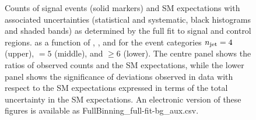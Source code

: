 \begin{figure}
\begin{center}
  \caption{Counts of signal events (solid markers) and SM expectations
    with associated uncertainties (statistical and systematic, black
    histograms and shaded bands) 
    as determined by the full fit to signal and control regions.
    as a function of \nb, \scalht, and \mht for the event categories
    $n_{\text{jet}} = 4$ (upper), $=5$ (middle), and ${\geq}6$ (lower).
    The centre panel shows the ratios of
    observed counts and the SM expectations, while the lower panel
    shows the significance of deviations observed in data with respect
    to the SM expectations expressed in terms of the total uncertainty
    in the SM expectations.
    An electronic version of these figures is available as FullBinning\_full-fit-bg\_aux.csv.
    }
        \label{fig:T1qqqqLL_full-fit_456}
    \end{center}
\end{figure}

